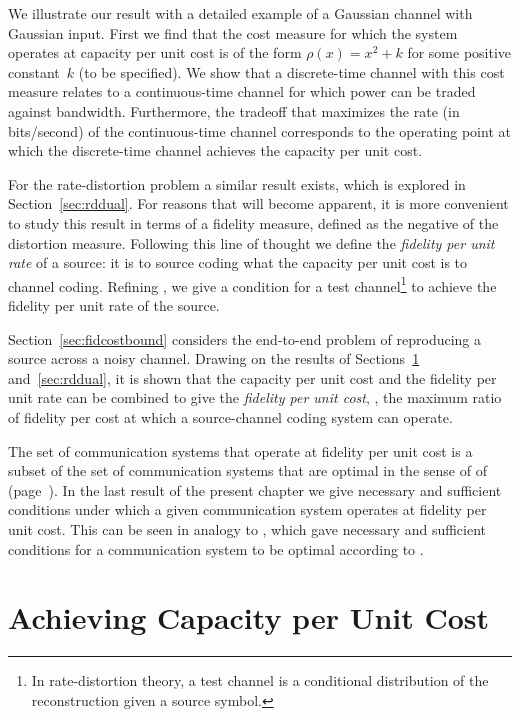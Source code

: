 We illustrate our result with a detailed example of a Gaussian channel with
Gaussian input.  First we find that the cost measure for which the system
operates at capacity per unit cost is of the form $\rho(x) = x^2 + k$ for some
positive constant~$k$ (to be specified). We show that a discrete-time channel
with this cost measure relates to a continuous-time channel for which power can
be traded against bandwidth.  Furthermore, the tradeoff that maximizes the rate
(in bits\slash second) of the continuous-time channel corresponds to the
operating point at which the discrete-time channel achieves the capacity per
unit cost.

For the rate-distortion problem a similar result exists, which is explored in
Section~\ref{sec:rddual}. For reasons that will become apparent, it is more
convenient to study this result in terms of a fidelity measure, defined as the
negative of the distortion measure. Following this line of
thought we define the \emph{fidelity per unit rate} of a source:
it is to source coding what the capacity per unit cost is to channel coding.
Refining , we give a condition for a test
channel\footnote{In rate-distortion theory, a test channel is a conditional
distribution of the reconstruction given a source symbol.}
to achieve the fidelity per unit rate of the source. 

Section~\ref{sec:fidcostbound} considers the end-to-end problem of
reproducing a source across a noisy channel. Drawing on the results of
Sections~\ref{sec:cuc} and~\ref{sec:rddual}, it is shown that the capacity per
unit cost and the fidelity per unit rate can be combined to give the
\emph{fidelity per unit cost}, \ie, the maximum ratio of fidelity per cost at
which a source-channel coding system can operate.

The set of communication systems that operate at fidelity per unit cost is a
subset of the set of communication systems that are optimal in the sense of
 of  (page~\pageref{def:optimality}).
In the last result of the present chapter we give necessary and sufficient
conditions under which a given communication  system operates at fidelity per
unit cost. This can be seen in analogy to , which
gave necessary and sufficient conditions for a communication system to be
optimal according to .


\section{Achieving Capacity per Unit Cost}
\label{sec:cuc}

